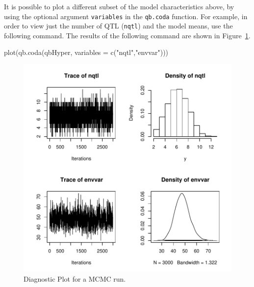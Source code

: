 \documentclass{article}
\begin{document}
It is possible to plot a different subset of the model characteristics above, by using the 
optional argument \texttt{variables} in the \texttt{qb.coda} function.  For example,
in order to view just the number of QTL (\texttt{nqtl}) and the model means, use the following command.  The results of the following command are
shown in Figure~\ref{figPlotQBCODA}.
\begin{Schunk}
\begin{Sinput}
plot(qb.coda(qbHyper, variables = c("nqtl","envvar")))
\end{Sinput}
\end{Schunk}
\begin{figure}
\includegraphics{qtlbimPDF/FIG-QBCODA}
\caption{Diagnostic Plot for a MCMC run.}
\label{figPlotQBCODA}
\end{figure}
\end{document}
